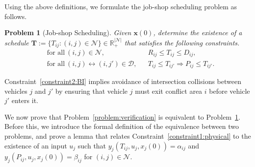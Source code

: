 \documentclass{sig-alternate}
\newtheorem{problem}{Problem}
\begin{document}
	
Using the above definitions, we formulate the job-shop scheduling problem as follows.
\begin{problem}[Job-shop Scheduling]\label{problem:job-shop}
Given $\mathbf{x}(0)$, determine the existence of a schedule $\mathbf{T}:=\{T_{ij}:(i,j)\in\mathcal{N}\}\in\mathbb{R}_+^{|\mathcal{N}|}$ that satisfies the following constraints.
\begin{align}
&\text{for all}~(i,j)\in\mathcal{N}, && R_{ij}\leq T_{ij}\leq D_{ij},\label{constraint1:physical}\\
&\text{for all}~(i,j)\leftrightarrow (i,j') \in\mathcal{D}, && T_{ij}\leq T_{ij'}\Rightarrow P_{ij} \leq T_{ij'}.\label{constraint2:BI}
\end{align}
\end{problem}

Constraint~\eqref{constraint2:BI} implies avoidance of intersection collisions between vehicles $j$ and $j'$ by ensuring that vehicle $j$ must exit conflict area $i$ before vehicle $j'$ enters it. 


We now prove that Problem~\ref{problem:verification} is equivalent to Problem~\ref{problem:job-shop}. Before this, we introduce the formal definition of the equivalence between two problems, and prove a lemma that relates Constraint~\eqref{constraint1:physical} to the existence of an input $u_j$ such that $y_j(T_{ij},u_j,x_j(0))=\alpha_{ij}$ and $y_j(P_{ij},u_j,x_j(0))=\beta_{ij}$ for $(i,j)\in\mathcal{N}$.
\end{document}
